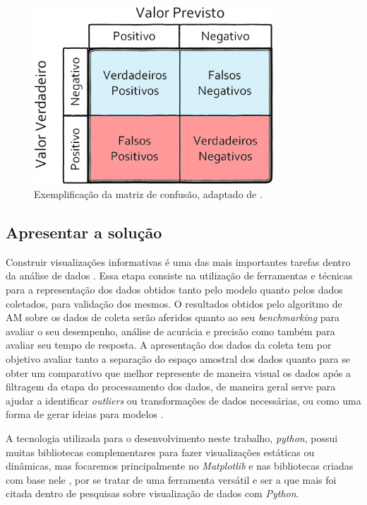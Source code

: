\begin{figure}[!htb]
	\centering
	\includegraphics[width=0.8\textwidth]{figuras/matriz_consusao.eps}
	\caption{Exemplificação da matriz de confusão, adaptado de .}
	\label{matriz_consusao}
\end{figure}

\subsection{Apresentar a solução}
Construir visualizações informativas é uma das mais importantes tarefas dentro da análise de dados \cite{McKinney2012datapython}. Essa etapa consiste na utilização de ferramentas e técnicas para a representação dos dados obtidos tanto pelo modelo quanto pelos dados coletados, para validação dos mesmos. O resultados obtidos pelo algoritmo de AM sobre os dados de coleta serão aferidos quanto ao seu \textit{benchmarking} \cite{Benchmarking} para avaliar o seu desempenho, análise de acurácia e precisão como também para avaliar seu tempo de resposta. A apresentação dos dados da coleta tem por objetivo avaliar tanto a separação do espaço amostral dos dados quanto para se obter um comparativo que melhor represente de maneira visual os dados após a filtragem da etapa do processamento dos dados, de maneira geral serve para ajudar a identificar \textit{outliers} ou transformações de dados necessárias, ou como uma forma de gerar ideias para modelos \cite{McKinney2012datapython}.

A tecnologia utilizada para o desenvolvimento neste trabalho, \textit{python}, possui muitas bibliotecas complementares para fazer visualizações estáticas ou dinâmicas, mas focaremos principalmente no \textit{Matplotlib} e nas bibliotecas criadas com base nele \cite{McKinney2012datapython}, por se tratar de uma ferramenta versátil e ser a que mais foi citada dentro de pesquisas sobre visualização de dados com \textit{Python}.

